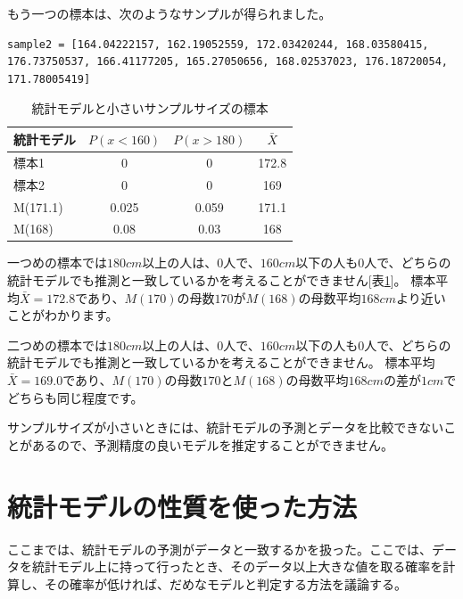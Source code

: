 もう一つの標本は、次のようなサンプルが得られました。
\begin{lstlisting}
sample2 = [164.04222157, 162.19052559, 172.03420244, 168.03580415, 176.73750537, 166.41177205, 165.27050656, 168.02537023, 176.18720054, 171.78005419]
\end{lstlisting}


\begin{table}[hbtp]
    \caption{統計モデルと小さいサンプルサイズの標本}
    \label{table:smalle_sample_size}
    \centering
    \begin{tabular}{lccc}
    統計モデル  & $P(x<160)$  & $P(x>180)$  & $\bar{X}$ \\
    \hline \hline
    標本1 &  0 &  0 & 172.8 \\
    標本2 &  0 &  0 & 169 \\
    M(171.1) & 0.025 & 0.059  & 171.1 \\
    M(168) &  0.08 & 0.03 & 168\\
      \hline
    \end{tabular}
  \end{table}
一つめの標本では$180cm$以上の人は、$0$人で、$160cm$以下の人も$0$人で、どちらの統計モデルでも推測と一致しているかを考えることができません[表\ref{table:smalle_sample_size}]。
標本平均$\bar{X}=172.8$であり、$M(170)$の母数$170$が$M(168)$の母数平均$168cm$より近いことがわかります。

二つめの標本では$180cm$以上の人は、$0$人で、$160cm$以下の人も$0$人で、どちらの統計モデルでも推測と一致しているかを考えることができません。
標本平均$\bar{X}=169.0$であり、$M(170)$の母数$170$と$M(168)$の母数平均$168cm$の差が$1cm$でどちらも同じ程度です。

サンプルサイズが小さいときには、統計モデルの予測とデータを比較できないことがあるので、予測精度の良いモデルを推定することができません。





\section{統計モデルの性質を使った方法}
ここまでは、統計モデルの予測がデータと一致するかを扱った。ここでは、データを統計モデル上に持って行ったとき、そのデータ以上大きな値を取る確率を計算し、その確率が低ければ、だめなモデルと判定する方法を議論する。

